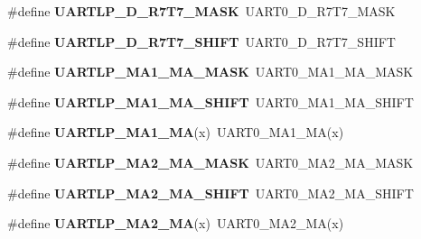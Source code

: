 \begin{DoxyCompactItemize}
\#define {\bfseries U\+A\+R\+T\+L\+P\+\_\+\+D\+\_\+\+R7\+T7\+\_\+\+M\+A\+SK}~U\+A\+R\+T0\+\_\+\+D\+\_\+\+R7\+T7\+\_\+\+M\+A\+SK
\item 
\mbox{\label{group___backward___compatibility___symbols_gab2a3957242355f16f9523cdba45c32b6}} 
\#define {\bfseries U\+A\+R\+T\+L\+P\+\_\+\+D\+\_\+\+R7\+T7\+\_\+\+S\+H\+I\+FT}~U\+A\+R\+T0\+\_\+\+D\+\_\+\+R7\+T7\+\_\+\+S\+H\+I\+FT
\item 
\mbox{\label{group___backward___compatibility___symbols_ga187ea00ba1985df3b626c8d88897d693}} 
\#define {\bfseries U\+A\+R\+T\+L\+P\+\_\+\+M\+A1\+\_\+\+M\+A\+\_\+\+M\+A\+SK}~U\+A\+R\+T0\+\_\+\+M\+A1\+\_\+\+M\+A\+\_\+\+M\+A\+SK
\item 
\mbox{\label{group___backward___compatibility___symbols_ga62055de0c9859d4d9308b092e5fee5e9}} 
\#define {\bfseries U\+A\+R\+T\+L\+P\+\_\+\+M\+A1\+\_\+\+M\+A\+\_\+\+S\+H\+I\+FT}~U\+A\+R\+T0\+\_\+\+M\+A1\+\_\+\+M\+A\+\_\+\+S\+H\+I\+FT
\item 
\mbox{\label{group___backward___compatibility___symbols_gae1c043e76d3e412ec723a033513ceac6}} 
\#define {\bfseries U\+A\+R\+T\+L\+P\+\_\+\+M\+A1\+\_\+\+MA}(x)~U\+A\+R\+T0\+\_\+\+M\+A1\+\_\+\+MA(x)
\item 
\mbox{\label{group___backward___compatibility___symbols_gaf7ea6dd269e7c9e321d53599db756e75}} 
\#define {\bfseries U\+A\+R\+T\+L\+P\+\_\+\+M\+A2\+\_\+\+M\+A\+\_\+\+M\+A\+SK}~U\+A\+R\+T0\+\_\+\+M\+A2\+\_\+\+M\+A\+\_\+\+M\+A\+SK
\item 
\mbox{\label{group___backward___compatibility___symbols_ga85f77220a0349e3a2862f9d08f670133}} 
\#define {\bfseries U\+A\+R\+T\+L\+P\+\_\+\+M\+A2\+\_\+\+M\+A\+\_\+\+S\+H\+I\+FT}~U\+A\+R\+T0\+\_\+\+M\+A2\+\_\+\+M\+A\+\_\+\+S\+H\+I\+FT
\item 
\mbox{\label{group___backward___compatibility___symbols_ga49450a92c02a7d5af71ec00dc7e8ab3f}} 
\#define {\bfseries U\+A\+R\+T\+L\+P\+\_\+\+M\+A2\+\_\+\+MA}(x)~U\+A\+R\+T0\+\_\+\+M\+A2\+\_\+\+MA(x)

\end{DoxyCompactItemize}
